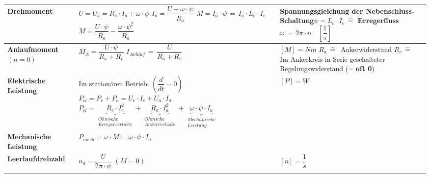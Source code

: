 \renewcommand{\arraystretch}{2.5}
\begin{tabular}{| C{4cm} | P{7cm} | P{7cm} |}
	\firsthline
	\textbf{Drehmoment}	& $U = U_a = R_a\cdot I_a + \omega\cdot\psi$ \newline \newline $I_a = \dfrac{U - \omega\cdot\psi}{R_a}$ \newline \newline $M = I_a\cdot\psi\, = \, I_a \cdot L_e \cdot I_e $ \newline\newline $M = \dfrac{U\cdot\psi}{R_a}-\dfrac{\omega\cdot\psi^2}{R_a}$ \newline & Spannungsgleichung der Nebenschluss-Schaltung\newline \newline $\psi = L_e\cdot I_e \, \widehat{=}$ Erregerfluss \newline \newline $\omega\, = \, 2\pi\cdot n \quad \left[\dfrac{1}{s}\right]$ \\
	\hline
	\textbf{Anlaufmoment} \newline \newline $(n = 0)$	& $M_A = \dfrac{U\cdot\psi}{R_a + R_v}$ \newline \newline $I_{Anlauf} \,= \, \dfrac{U}{R_a + R_v} $ & $[M] = Nm$ \newline $R_a \, \widehat{=}$\, Ankerwiderstand \newline $R_v \, \widehat{=}$ Im Ankerkreis in Serie geschalteter Regelungswiderstand (= \textbf{oft 0})\\
	\hline
	\textbf{Elektrische Leistung} & Im stationären Betrieb: \quad $\left(\dfrac{d}{dt} = 0\right)$ \newline \newline $P_{el} = P_e + P_a = U_e\cdot I_e + U_a\cdot I_a$ \newline \newline $P_{el} = \underbrace{R_e\cdot I_e^2}_{\substack{Ohmsche \\ Erregerverluste}} + \underbrace{R_a\cdot I_a^2}_{\substack{Ohmsche \\ Ankerverluste}} + \underbrace{\omega\cdot\psi\cdot I_a}_{\substack{Mechanische\\Leistung}}$ \newline & $[P] = W$ \\
	\hline
	\textbf{Mechanische Leistung} & $P_{mech} = \omega\cdot M = \omega\cdot\psi\cdot I_a$ & \\
	\hline
	\textbf{Leerlaufdrehzahl}& $n_0 = \dfrac{U}{2\pi\cdot\psi}$  \qquad $(M = 0)$& $[n] = \dfrac{1}{s}$\\
	\lasthline
\end{tabular}
\newpage

